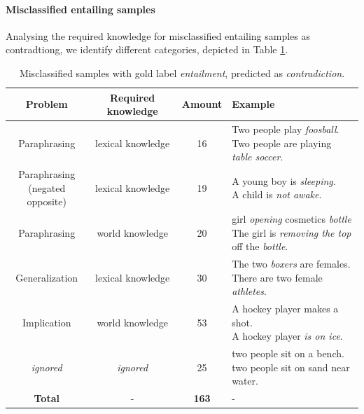 \paragraph*{Misclassified entailing samples}
Analysing the required knowledge for misclassified entailing samples as contradtiong, we identify different categories, depicted in Table \ref{tab:misclassified_orig_ent}.
\begin{table}[tph!]
\centering
\begin{tabular}{cccl}
\textbf{Problem} & \textbf{Required knowledge} & \textbf{Amount} & \textbf{Example} \\
\toprule
Paraphrasing & lexical knowledge & 16 & \specialcell{Two people play \textit{foosball}.\\Two people are playing \textit{table soccer}.}\\
\specialcellc{Paraphrasing\\(negated opposite)} & lexical knowledge & 19 & \specialcell{A young boy is \textit{sleeping}.\\A child is \textit{not awake}.}\\
Paraphrasing & world knowledge & 20 & \specialcell{girl \textit{opening} cosmetics \textit{bottle}\\The girl is \textit{removing the top} off the \textit{bottle}.}\\
Generalization & lexical knowledge & 30 & \specialcell{The two \textit{boxers} are females.\\There are two female \textit{athletes}.}\\
Implication & world knowledge & 53 & \specialcell{A hockey player makes a shot.\\A hockey player \textit{is on ice}.}\\
\midrule
\textit{ignored} & \textit{ignored} & 25 & \specialcell{two people sit on a bench.\\two people sit on sand near water.} \\
\midrule
\textbf{Total} & - & \textbf{163} & - \\
\bottomrule      
\end{tabular}
\caption{Misclassified samples with gold label \textit{entailment}, predicted as \textit{contradiction}.}
\label{tab:misclassified_orig_ent}
\end{table}
